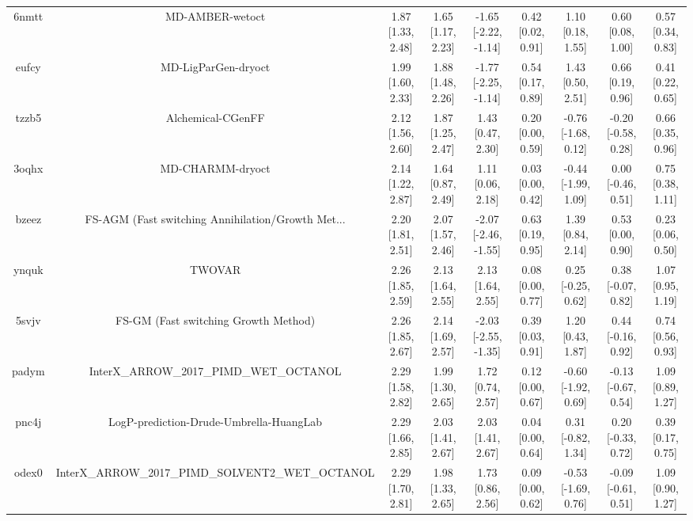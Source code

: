 \documentclass{article}
\begin{document}
\begin{center}
\begin{longtable}{|ccccccccc|}
 6nmtt &                                    MD-AMBER-wetoct &  1.87 [1.33, 2.48] &  1.65 [1.17, 2.23] &  -1.65 [-2.22, -1.14] &  0.42 [0.02, 0.91] &    1.10 [0.18, 1.55] &    0.60 [0.08, 1.00] &     0.57 [0.34, 0.83] \\
 eufcy &                                MD-LigParGen-dryoct &  1.99 [1.60, 2.33] &  1.88 [1.48, 2.26] &  -1.77 [-2.25, -1.14] &  0.54 [0.17, 0.89] &    1.43 [0.50, 2.51] &    0.66 [0.19, 0.96] &     0.41 [0.22, 0.65] \\
 tzzb5 &                                  Alchemical-CGenFF &  2.12 [1.56, 2.60] &  1.87 [1.25, 2.47] &     1.43 [0.47, 2.30] &  0.20 [0.00, 0.59] &  -0.76 [-1.68, 0.12] &  -0.20 [-0.58, 0.28] &     0.66 [0.35, 0.96] \\
 3oqhx &                                   MD-CHARMM-dryoct &  2.14 [1.22, 2.87] &  1.64 [0.87, 2.49] &     1.11 [0.06, 2.18] &  0.03 [0.00, 0.42] &  -0.44 [-1.99, 1.09] &   0.00 [-0.46, 0.51] &     0.75 [0.38, 1.11] \\
 bzeez &  FS-AGM (Fast switching Annihilation/Growth Met... &  2.20 [1.81, 2.51] &  2.07 [1.57, 2.46] &  -2.07 [-2.46, -1.55] &  0.63 [0.19, 0.95] &    1.39 [0.84, 2.14] &    0.53 [0.00, 0.90] &     0.23 [0.06, 0.50] \\
 ynquk &                                             TWOVAR &  2.26 [1.85, 2.59] &  2.13 [1.64, 2.55] &     2.13 [1.64, 2.55] &  0.08 [0.00, 0.77] &   0.25 [-0.25, 0.62] &   0.38 [-0.07, 0.82] &     1.07 [0.95, 1.19] \\
 5svjv &               FS-GM (Fast switching Growth Method) &  2.26 [1.85, 2.67] &  2.14 [1.69, 2.57] &  -2.03 [-2.55, -1.35] &  0.39 [0.03, 0.91] &    1.20 [0.43, 1.87] &   0.44 [-0.16, 0.92] &     0.74 [0.56, 0.93] \\
 padym &            InterX\_ARROW\_2017\_PIMD\_WET\_OCTANOL &  2.29 [1.58, 2.82] &  1.99 [1.30, 2.65] &     1.72 [0.74, 2.57] &  0.12 [0.00, 0.67] &  -0.60 [-1.92, 0.69] &  -0.13 [-0.67, 0.54] &     1.09 [0.89, 1.27] \\
 pnc4j &            LogP-prediction-Drude-Umbrella-HuangLab &  2.29 [1.66, 2.85] &  2.03 [1.41, 2.67] &     2.03 [1.41, 2.67] &  0.04 [0.00, 0.64] &   0.31 [-0.82, 1.34] &   0.20 [-0.33, 0.72] &     0.39 [0.17, 0.75] \\
 odex0 &  InterX\_ARROW\_2017\_PIMD\_SOLVENT2\_WET\_OCTANOL &  2.29 [1.70, 2.81] &  1.98 [1.33, 2.65] &     1.73 [0.86, 2.56] &  0.09 [0.00, 0.62] &  -0.53 [-1.69, 0.76] &  -0.09 [-0.61, 0.51] &     1.09 [0.90, 1.27] \\

\end{longtable}
\end{center}
\end{document}

